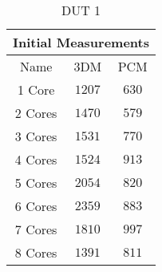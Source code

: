 \begin{table}[H]
    \centering
    \begin{tabular}{|| c | c | c ||}
    \hline
    \multicolumn{3}{||c||}{Initial Measurements} \\ [0.5ex] \hline\hline
    Name & 3DM & PCM \\\hline
    1 Core & $1207$ & $630$ \\
    2 Cores & $1470$ & $579$ \\
    3 Cores & $1531$ & $770$ \\
    4 Cores & $1524$ & $913$ \\
    5 Cores & $2054$ & $820$ \\
    6 Cores & $2359$ & $883$ \\
    7 Cores & $1810$ & $997$ \\
    8 Cores & $1391$ & $811$ \\\hline
    \end{tabular}
    \caption{DUT 1}
    \label{tab:initial-measurements-exp-3-dut-1-app}
\end{table}